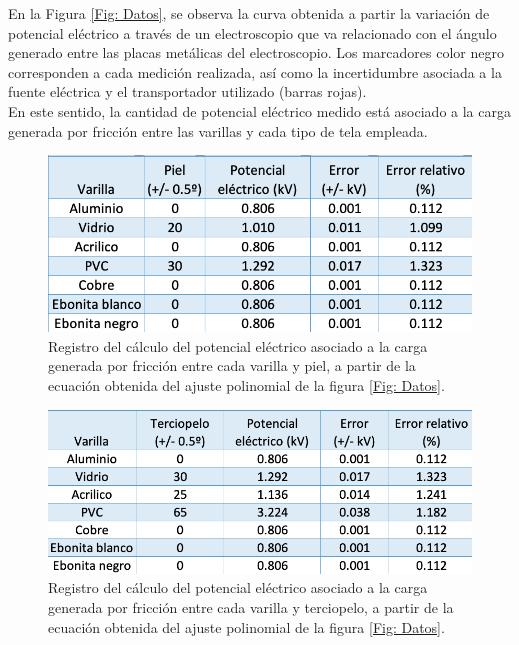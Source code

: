 \documentclass[10pt,journal]{IEEEtran}
\begin{document}
En la Figura \ref{Fig: Datos}, se observa la curva obtenida a partir la variación de potencial eléctrico a través de un electroscopio que va relacionado con el ángulo generado entre las placas metálicas del electroscopio. Los marcadores color negro corresponden a cada medición realizada, así como la incertidumbre asociada a la fuente eléctrica y el transportador utilizado (barras rojas).\\

En este sentido, la cantidad de potencial eléctrico medido está asociado a la carga generada por fricción entre las varillas y cada tipo de tela empleada.

\begin{figure}[H]
\centering
\includegraphics[scale=0.3]{piel.png}
\caption{Registro del cálculo del potencial eléctrico asociado a la carga generada por fricción entre cada varilla y piel, a partir de la ecuación obtenida del ajuste polinomial de la figura \ref{Fig: Datos}.}
\end{figure}

\begin{figure}[H]
\centering
\includegraphics[scale=0.29]{terciopelo.png}
\caption{Registro del cálculo del potencial eléctrico asociado a la carga generada por fricción entre cada varilla y terciopelo, a partir de la ecuación obtenida del ajuste polinomial de la figura \ref{Fig: Datos}.}
\end{figure}
\end{document}
